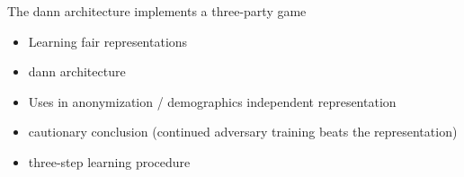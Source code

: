 The \ac{dann} architecture \citep{ganin2016domain} implements a three-party game 

\begin{itemize}
    \item Learning fair representations \citep{zemel2013learning}
    \item \Ac{dann} architecture \citep{ganin2016domain}
    \item Uses in anonymization / demographics independent representation \citet{elazar2018adversarial,li2018towards}
    \item \citet{elazar2018adversarial} cautionary conclusion (continued adversary training beats the representation)
    \item \citet{feutry2018learning} three-step learning procedure
\end{itemize}
